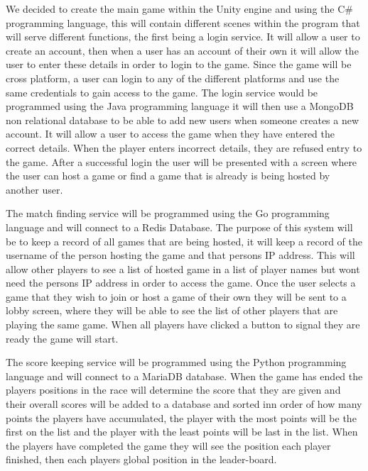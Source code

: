 We decided to create the main game within the Unity engine and using the C\# programming language, this will contain different scenes within the program that will serve different functions, the first being a login service. It will allow a user to create an account, then when a user has an account of their own it will allow the user to enter these details in order to login to the game. Since the game will be cross platform, a user can login to any of the different platforms and use the same credentials to gain access to the game. The login service would be programmed using the Java programming language it will then use a MongoDB non relational database to be able to add new users when someone creates a new account. It will allow a user to access the game when they have entered the correct details. When the player enters incorrect details, they are refused entry to the game. After a successful login the user will be presented with a screen where the user can host a game or find a game that is already is being hosted by another user.\newline  

The match finding service will be programmed using the Go programming language and will connect to a Redis Database. The purpose of this system will be to keep a record of all games that are being hosted, it will keep a record of the username of the person hosting the game and that persons IP address. This will allow other players to see a list of hosted game in a list of player names but wont need the persons IP address in order to access the game. Once the user selects a game that they wish to join or host a game of their own they will be sent to a lobby screen, where they will be able to see the list of other players that are playing the same game. When all players have clicked a button to signal they are ready the game will start.\newline 

The score keeping service will be programmed using the Python programming language and will connect to a MariaDB database. When the game has ended the players positions in the race will determine the score that they are given and their overall scores will be added to a database and sorted inn order of how many points the players have accumulated, the player with the most points will be the first on the list and the player with the least points will be last in the list. When the players have completed the game they will see the position each player finished, then each players global position in the leader-board.\newline

